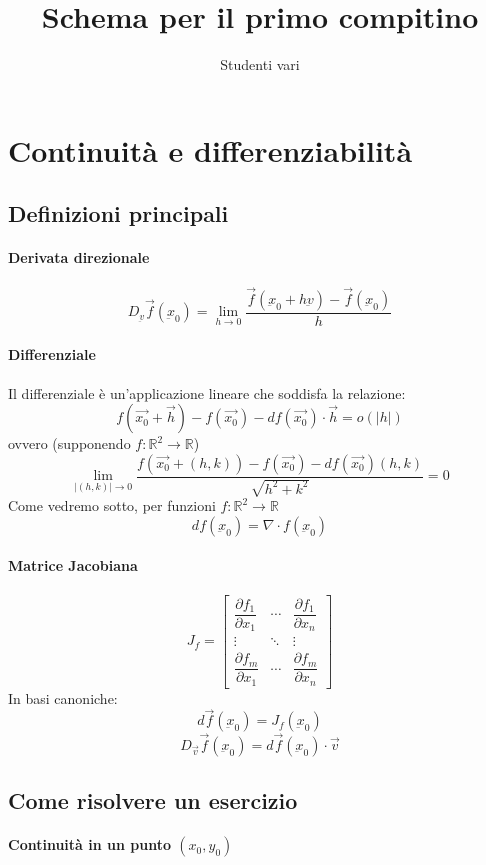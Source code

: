 \documentclass[a4paper,10pt]{book}
\author{Studenti vari}
\title{Schema per il primo compitino}
\begin{document}
\maketitle

\section{Continuità e differenziabilità}
\subsection{Definizioni principali}
\paragraph{Derivata direzionale}
$$D_{\underbar{v}} \vec{f}(\underbar{x}_0) = \lim_{h \to 0}{\dfrac{\vec{f}(\underbar{x}_0+h\underbar{v})-\vec{f}(\underbar{x}_0)}{h}}$$
\paragraph{Differenziale}
Il differenziale è un'applicazione lineare che soddisfa la relazione:
$$f(\vec{x_0}+\vec{h}) - f(\vec{x_0}) - df(\vec{x_0})\cdot\vec{h} = o(|h|)$$
ovvero (supponendo $f:\mathbb{R}^2\rightarrow\mathbb{R}$)
$$ \lim_{|(h, k)| \to 0} \dfrac{f(\vec{x_0}+(h, k)) - f(\vec{x_0}) - df(\vec{x_0})(h, k)}{\sqrt{h^2+k^2}} = 0 $$
Come vedremo sotto, per funzioni $f: \mathbb{R}^2 \rightarrow \mathbb{R}$
$$df(\underbar{x}_0) = \nabla \cdot f(\underbar{x}_0)$$
\paragraph{Matrice Jacobiana}
$$J_f = \begin{bmatrix} \dfrac{\partial f_1}{\partial x_1} & \cdots & \dfrac{\partial f_1}{\partial x_n} \\ \vdots & \ddots & \vdots \\ \dfrac{\partial f_m}{\partial x_1} & \cdots & \dfrac{\partial f_m}{\partial x_n}  \end{bmatrix}$$
In basi canoniche:
$$ d\vec{f}(\underbar{x}_0)= J_f(\underbar{x}_0) $$
$$D_{\vec{v}} \vec{f}(\underbar{x}_0) = d\vec{f}(\underbar{x}_0)\cdot\vec{v}$$
\subsection{Come risolvere un esercizio}
\paragraph{Continuità in un punto $(x_0, y_0)$}
\end{document}
